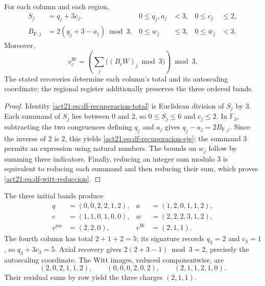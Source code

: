 \begin{theorem}
\label{act21:thm:df-recuperacion-firma}
For each column and each region,
\begin{align}
 S_j&=q_j+3c_j,&0\leq q_j,a_j&<3,&0\leq c_j&\leq2,
 \label{act21:eq:df-recuperacion-total}\\
 B_{\mathrm F,j}&=2(q_j+3-a_j)\bmod3,&0\leq w_j&\leq3,
 &0\leq\bar w_j&<3.
 \label{act21:eq:df-recuperacion-eje}
\end{align}
Moreover,
\begin{equation}
 v_c^{\mathrm W}
 =\left(\sum_j\bigl((B_cW)_j\bmod3\bigr)\right)\bmod3.
 \label{act21:eq:df-witt-reduccion}
\end{equation}
The stated recoveries determine each column's total and its autoscaling
coordinate; the regional register additionally preserves the three
ordered bands.
\end{theorem}

\begin{proof}
Identity \eqref{act21:eq:df-recuperacion-total} is Euclidean division of
\(S_j\) by \(3\). Each summand of \(S_j\) lies between \(0\) and
\(2\), so \(0\leq S_j\leq6\) and \(c_j\leq2\). In \(\mathbb F_3\),
subtracting the two congruences defining \(q_j\) and \(a_j\) gives
\(q_j-a_j=2B_{\mathrm F,j}\). Since the inverse of \(2\) is \(2\),
this yields \eqref{act21:eq:df-recuperacion-eje}; the summand \(3\) permits
an expression using natural numbers. The bounds on \(w_j\) follow by
summing three indicators. Finally, reducing an integer sum modulo \(3\)
is equivalent to reducing each summand and then reducing their sum,
which proves \eqref{act21:eq:df-witt-reduccion}.
\end{proof}

\begin{example}
The three initial bands produce
\begin{align*}
 q&=(0,0,2,2,1,2),&a&=(1,2,0,1,1,2),\\
 c&=(1,1,0,1,0,0),&w&=(2,2,2,3,1,2),\\
 v^{\mathrm{res}}&=(2,2,0),&v^{\mathrm W}&=(2,1,1).
\end{align*}
The fourth column has total \(2+1+2=5\); its signature records
\(q_3=2\) and \(c_3=1\), so \(q_3+3c_3=5\).
Axial recovery gives
\(2(2+3-1)\bmod3=2\), precisely the autoscaling coordinate.
The Witt images, reduced componentwise, are
\[
 (2,0,2,1,1,2),\qquad
 (0,0,0,2,0,2),\qquad
 (2,1,1,2,1,0).
\]
Their residual sums by row yield the three charges \((2,1,1)\).
\end{example}

